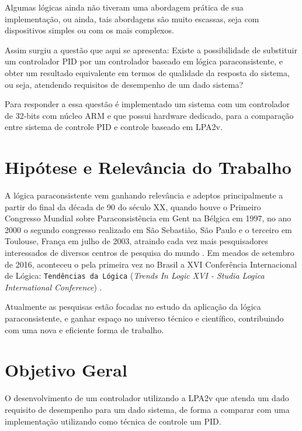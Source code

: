 Algumas lógicas ainda não tiveram  uma abordagem prática de sua implementação, 
ou ainda, tais abordagens são muito escassas, 
seja com dispositivos simples ou com os mais complexos.

Assim surgiu a questão que aqui se apresenta: 
Existe a possibilidade de substituir um controlador PID por 
um controlador baseado em lógica paraconsistente, 
e obter um resultado equivalente em termos de qualidade da resposta do sistema, 
ou seja, atendendo requisitos de desempenho de um dado sistema? 

Para responder a essa questão é implementado um sistema com 
um controlador de 32-bits com núcleo ARM e %
que possui hardware dedicado, 
para a comparação entre sistema de controle PID e controle baseado em LPA2v.



\section{Hipótese e Relevância do Trabalho}

A lógica paraconsistente vem ganhando relevância e adeptos 
principalmente a partir do final da década de 90 do século XX, 
quando houve o Primeiro Congresso Mundial sobre Paraconsistência em 
Gent na Bélgica em 1997, 
no ano 2000 o segundo congresso realizado em São Sebastião, São Paulo e 
o terceiro em Toulouse, França em julho de 2003, 
atraindo cada vez mais pesquisadores interessados de 
diversos centros de pesquisa do mundo \cite{DecioKrause}. 
Em meados de setembro de 2016, 
aconteceu o pela primeira vez no Brasil a 
XVI Conferência Internacional de Lógica: 
\texttt{Tendências da Lógica} 
(\emph{Trends In Logic XVI - Studia Logica International Conference}) 
\cite{trendsinlogic}.

Atualmente as pesquisas estão focadas no 
estudo da aplicação da lógica paraconsistente, 
e ganhar espaço no universo técnico e científico, 
contribuindo com uma nova e eficiente forma de trabalho.





\section{Objetivo Geral}
O desenvolvimento de um controlador utilizando a LPA2v que atenda um dado
requisito de desempenho para um dado sistema, 
de forma a comparar com uma implementação utilizando 
como técnica de controle um PID.



